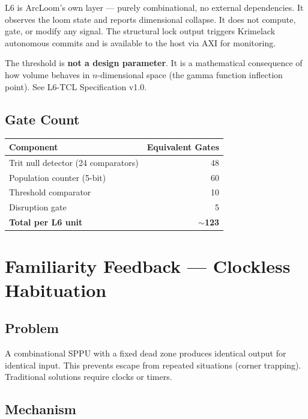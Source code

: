 \documentclass[11pt, a4paper]{article}
\begin{document}
L6 is ArcLoom's own layer --- purely combinational, no external
dependencies. It observes the loom state and reports dimensional
collapse. It does not compute, gate, or modify any signal. The
structural lock output triggers Krimelack autonomous commits and
is available to the host via AXI for monitoring.

The threshold is \textbf{not a design parameter}. It is a mathematical
consequence of how volume behaves in $n$-dimensional space (the
gamma function inflection point). See L6-TCL Specification v1.0.

\subsection{Gate Count}

\begin{center}
\begin{tabular}{@{}lr@{}}
\toprule
\textbf{Component} & \textbf{Equivalent Gates} \\
\midrule
Trit null detector (24 comparators) & 48 \\
Population counter (5-bit) & 60 \\
Threshold comparator & 10 \\
Disruption gate & 5 \\
\midrule
\textbf{Total per L6 unit} & \textbf{$\sim$123} \\
\bottomrule
\end{tabular}
\end{center}

\section{Familiarity Feedback — Clockless Habituation}

\subsection{Problem}

A combinational SPPU with a fixed dead zone produces identical output for
identical input. This prevents escape from repeated situations (corner
trapping). Traditional solutions require clocks or timers.

\subsection{Mechanism}
\end{document}

